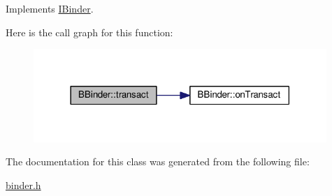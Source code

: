 Implements \hyperlink{classIBinder_aecaee0fd230aab5cea5b28e0fc88f426}{I\-Binder}.



Here is the call graph for this function\-:
\nopagebreak
\begin{figure}[H]
\begin{center}
\leavevmode
\includegraphics[width=314pt]{classBBinder_a3017278da0f18ac1280f328ac1cab221_cgraph}
\end{center}
\end{figure}




The documentation for this class was generated from the following file\-:\begin{DoxyCompactItemize}
\item 
\hyperlink{binder_8h}{binder.\-h}\end{DoxyCompactItemize}

